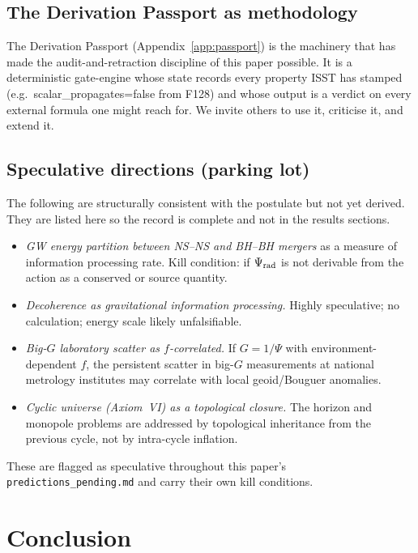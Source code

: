\documentclass[aps,prd,twocolumn,nofootinbib,floatfix,superscriptaddress]{revtex4-2}
\begin{document}
\subsection{The Derivation Passport as methodology}

The Derivation Passport (Appendix~\ref{app:passport}) is the
machinery that has made the audit-and-retraction discipline of this
paper possible. It is a deterministic gate-engine whose state
records every property ISST has stamped (e.g.\
\textsf{scalar\_propagates=false} from F128) and whose output is a
verdict on every external formula one might reach for. We invite
others to use it, criticise it, and extend it.

\subsection{Speculative directions (parking lot)}

The following are structurally consistent with the postulate but
not yet derived. They are listed here so the record is complete and
not in the results sections.

\begin{itemize}
\item \emph{GW energy partition between NS--NS and BH--BH mergers}
as a measure of information processing rate. Kill condition: if
$\Psi_{\rm rad}$ is not derivable from the action as a conserved
or source quantity.
\item \emph{Decoherence as gravitational information processing.}
Highly speculative; no calculation; energy scale likely
unfalsifiable.
\item \emph{Big-$G$ laboratory scatter as $f$-correlated.} If
$G=1/\Psi$ with environment-dependent $f$, the persistent
scatter in big-$G$ measurements at national metrology institutes
may correlate with local geoid/Bouguer anomalies.
\item \emph{Cyclic universe (Axiom~VI) as a topological closure.}
The horizon and monopole problems are addressed by topological
inheritance from the previous cycle, not by intra-cycle inflation.
\end{itemize}

These are flagged as speculative throughout this paper's
\texttt{predictions\_pending.md} and carry their own kill
conditions.

\section{Conclusion}
\label{sec:conclusion}
\end{document}
